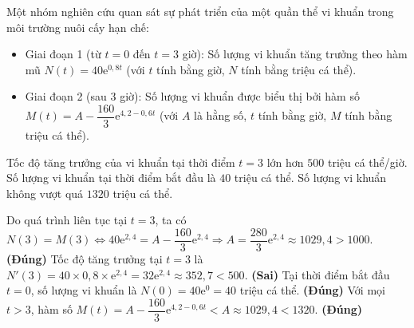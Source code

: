 \begin{ex}
Một nhóm nghiên cứu quan sát sự phát triển của một quần thể vi khuẩn trong môi trường nuôi cấy hạn chế:
\begin{itemize}
    \item Giai đoạn 1 (từ $t = 0$ đến $t = 3$ giờ): Số lượng vi khuẩn tăng trưởng theo hàm mũ $N(t) = 40\mathrm{e}^{0{,}8t}$ (với $t$ tính bằng giờ, $N$ tính bằng triệu cá thể).
    \item Giai đoạn 2 (sau $3$ giờ): Số lượng vi khuẩn được biểu thị bởi hàm số $M(t) = A - \dfrac{160}{3}\mathrm{e}^{4{,}2 - 0{,}6t}$ (với $A$ là hằng số, $t$ tính bằng giờ, $M$ tính bằng triệu cá thể).
\end{itemize}
{Tốc độ tăng trưởng của vi khuẩn tại thời điểm $t=3$ lớn hơn $500$ triệu cá thể/giờ.}
{\True Số lượng vi khuẩn tại thời điểm bắt đầu là $40$ triệu cá thể.}
{\True Số lượng vi khuẩn không vượt quá $1320$ triệu cá thể.}
\begin{loigiai}
\begin{itemchoice}
    \itemch Do quá trình liên tục tại $t=3$, ta có $N(3) = M(3) \Leftrightarrow 40\mathrm{e}^{2{,}4} = A - \dfrac{160}{3}\mathrm{e}^{2{,}4} \Rightarrow A = \dfrac{280}{3}\mathrm{e}^{2{,}4} \approx 1029{,}4 > 1000$. \textbf{(Đúng)}
    \itemch Tốc độ tăng trưởng tại $t=3$ là $N'(3) = 40 \times 0{,}8 \times \mathrm{e}^{2{,}4} = 32\mathrm{e}^{2{,}4} \approx 352{,}7 < 500$. \textbf{(Sai)}
    \itemch Tại thời điểm bắt đầu $t = 0$, số lượng vi khuẩn là $N(0) = 40\mathrm{e}^0 = 40$ triệu cá thể. \textbf{(Đúng)}
    \itemch Với mọi $t > 3$, hàm số $M(t) = A - \dfrac{160}{3}\mathrm{e}^{4{,}2-0{,}6t} < A \approx 1029{,}4 < 1320$. \textbf{(Đúng)}
\end{itemchoice}
\end{loigiai}
\end{ex}

